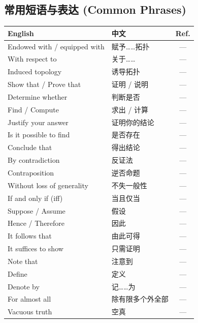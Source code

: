 \documentclass{article}
\begin{document}
\subsection*{常用短语与表达 (Common Phrases)}

\begin{tabular}{@{}lp{7.5cm}c@{}}
  \hline
  \textbf{English} & \textbf{中文} & \textbf{Ref.} \\
  \hline
  Endowed with / equipped with    & 赋予……拓扑 & --- \\
  With respect to                 & 关于…… & --- \\
  Induced topology                & 诱导拓扑 & --- \\
  Show that / Prove that          & 证明 / 说明 & --- \\
  Determine whether               & 判断是否 & --- \\
  Find / Compute                  & 求出 / 计算 & --- \\
  Justify your answer             & 证明你的结论 & --- \\
  Is it possible to find          & 是否存在 & --- \\
  Conclude that                   & 得出结论 & --- \\
  By contradiction                & 反证法 & --- \\
  Contraposition                  & 逆否命题 & --- \\
  Without loss of generality      & 不失一般性 & --- \\
  If and only if (iff)            & 当且仅当 & --- \\
  Suppose / Assume                & 假设 & --- \\
  Hence / Therefore               & 因此 & --- \\
  It follows that                 & 由此可得 & --- \\
  It suffices to show             & 只需证明 & --- \\
  Note that                       & 注意到 & --- \\
  Define                          & 定义 & --- \\
  Denote by                       & 记……为 & --- \\
  For almost all                  & 除有限多个外全部 & --- \\
  Vacuous truth                   & 空真 & --- \\
  \hline
\end{tabular}
\end{document}

